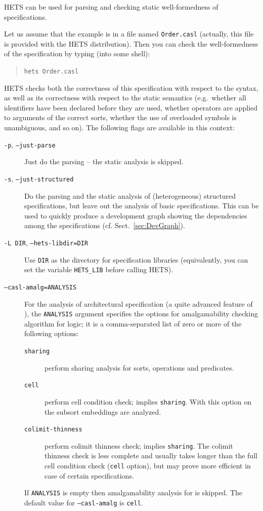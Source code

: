 \documentclass{article}
\newcommand{\normalTEXTSC}[2]{{#1\scriptsize#2}}
\newcommand     {\Hets}{\normalTEXTSC{H}{ETS}\xspace}
\begin{document}
\Hets can be used for parsing and 
checking static well-formedness of specifications.


Let us assume that the example is in a file named
\texttt{Order.casl} (actually, this file is provided 
with the \Hets distribution).
Then you can check the well-formedness of the
specification by typing (into some shell):

\begin{quote}
\texttt{hets Order.casl}
\end{quote}
\Hets checks both the correctness of this specification
 with respect to the \CASL syntax, as
well as its correctness with respect to the static semantics (e.g.\
whether all identifiers have been declared before they are used,
whether operators are applied to arguments of the correct sorts,
whether the use of overloaded symbols is unambiguous, and so on).
The following flags are available in this context:
\begin{description}
\item[\texttt{-p}, \texttt{--just-parse}] Just do the parsing -- the static analysis
is skipped.
\item[\texttt{-s}, \texttt{--just-structured}]
Do the parsing and the static analysis of (heterogeneous) structured
specifications, but leave out the analysis of basic specifications.
This can be used to quickly produce a development graph
showing the dependencies among the specifications (cf. Sect.~\ref{sec:DevGraph}).
\item[\texttt{-L DIR}, \texttt{--hets-libdir=DIR}]
Use \texttt{DIR} as the directory for specification libraries
(equivalently, you can set the variable \texttt{HETS\_LIB} before
calling \Hets).
\item[\texttt{--casl-amalg=ANALYSIS}]
  For the analysis of architectural specification (a quite advanced
  feature of \CASL), the \texttt{ANALYSIS} argument specifies the options for
  amalgamability checking 
  algorithm for \CASL logic; it is a comma-separated list of zero or
  more of the following options:
  \begin{description}
  \item[\texttt{sharing}] perform sharing analysis for sorts,
    operations and predicates.
  \item[\texttt{cell}] perform cell condition check; implies
    \texttt{sharing}. With this option on the subsort embeddings are
    analyzed. 
  \item[\texttt{colimit-thinness}] perform colimit thinness check;
    implies \texttt{sharing}. The colimit thinness check is less
    complete and usually takes longer than the full cell condition
    check (\texttt{cell} option), but may prove more efficient in case
    of certain specifications. 
  \end{description}
  If \texttt{ANALYSIS} is empty then amalgamability analysis for
  \CASL is skipped. 
  The default value for \texttt{--casl-amalg} is
  \texttt{cell}. 
\end{description}
\end{document}
